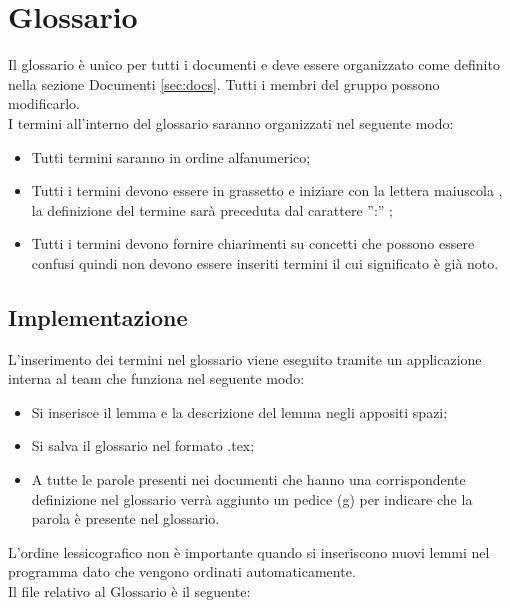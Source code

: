 \section{Glossario}{
 	Il glossario è unico per tutti i documenti e deve essere organizzato come definito nella sezione Documenti \ref{sec:docs}. Tutti i membri del gruppo possono modificarlo.\\
 	I termini all'interno del glossario saranno organizzati nel seguente modo:
 	\begin{itemize}
	 	\item Tutti termini saranno in ordine alfanumerico;
	 	\item Tutti i termini devono essere in grassetto e iniziare con la lettera maiuscola , la definizione del termine sarà preceduta dal carattere '':'' ;
	 	\item Tutti i termini devono fornire chiarimenti su concetti che possono essere confusi quindi non devono essere inseriti termini il cui significato è già noto.
 	\end{itemize}	
   \subsection{Implementazione}
      L'inserimento dei termini nel glossario viene eseguito tramite un applicazione interna al team che funziona nel seguente modo:
      \begin{itemize}
	      \item Si inserisce il lemma e la descrizione del lemma negli appositi spazi;
	      \item Si salva il glossario nel formato .tex;
	      \item A tutte le parole presenti nei documenti che hanno una corrispondente definizione nel glossario  verrà aggiunto un pedice (g) per indicare che la parola è presente nel glossario.
      \end{itemize}  
   L'ordine lessicografico non è importante quando si inseriscono nuovi lemmi nel programma dato che vengono ordinati automaticamente.\\
   Il file relativo al Glossario è il seguente: \href{run:../../Esterni/\fGlossario}{\fEscapeGlossario}
}